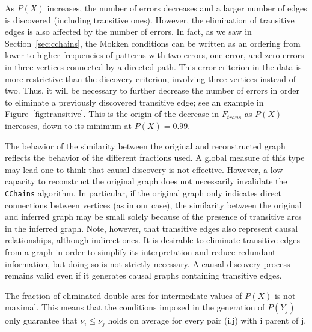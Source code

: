 \documentclass[12pt,a4paper]{report}
\begin{document}
As $P(X)$ increases, the number of errors decreases and a larger number of edges is discovered (including transitive ones). However, the elimination of transitive edges is also affected by the number of errors. In fact, as we saw in Section~\ref{sec:cchains}, the Mokken conditions can be written as an ordering from lower to higher frequencies of patterns with two errors, one error, and zero errors in three vertices connected by a directed path. This error criterion in the data is more restrictive than the discovery criterion, involving three vertices instead of two. Thus, it will be necessary to further decrease the number of errors in order to eliminate a previously discovered transitive edge; see an example in Figure~\ref{fig:transitive}. This is the origin of the decrease in $F_{trans}$ as $P(X)$ increases, down to its minimum at $P(X)= 0.99$.  

The behavior of the similarity between the original and reconstructed graph reflects the behavior of the different fractions used. A global measure of this type may lead one to think that causal discovery is not effective. However, a low capacity to reconstruct the original graph does not necessarily invalidate the \texttt{CChains} algorithm. In particular, if the original graph only indicates direct connections between vertices (as in our case), the similarity between the original and inferred graph may be small solely because of the presence of transitive arcs in the inferred graph. Note, however, that transitive edges also represent causal relationships, although indirect ones. It is desirable to eliminate transitive edges from a graph in order to simplify its interpretation and reduce redundant information, but doing so is not strictly necessary. A causal discovery process remains valid even if it generates causal graphs containing transitive edges.

The fraction of eliminated double arcs for intermediate values of $P(X)$ is not maximal. This means that the conditions imposed in the generation of $P(Y_j)$ only guarantee that $\nu_i \leq \nu_j$ holds on average for every pair (i,j) with i parent of j.
\end{document}
